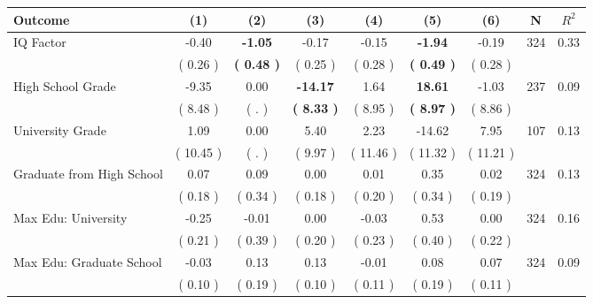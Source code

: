 \begin{tabular}{lcccccccc}
\toprule
 \textbf{Outcome} & \textbf{(1)} & \textbf{(2)} & \textbf{(3)} & \textbf{(4)} & \textbf{(5)} & \textbf{(6)} & \textbf{N} & \textbf{$ R^2$} \\
\midrule
IQ Factor &     -0.40 & \textbf{    -1.05} &     -0.17 &     -0.15 & \textbf{    -1.94} &     -0.19 & 324 &       0.33 \\ 
 & (     0.26 ) & \textbf{(     0.48 )} & (     0.25 ) & (     0.28 ) & \textbf{(     0.49 )} & (     0.28 ) & \\
High School Grade &     -9.35 &      0.00 & \textbf{   -14.17} &      1.64 & \textbf{    18.61} &     -1.03 & 237 &       0.09 \\ 
 & (     8.48 ) & (        . ) & \textbf{(     8.33 )} & (     8.95 ) & \textbf{(     8.97 )} & (     8.86 ) & \\
University Grade &      1.09 &      0.00 &      5.40 &      2.23 &    -14.62 &      7.95 & 107 &       0.13 \\ 
 & (    10.45 ) & (        . ) & (     9.97 ) & (    11.46 ) & (    11.32 ) & (    11.21 ) & \\
Graduate from High School &      0.07 &      0.09 &      0.00 &      0.01 &      0.35 &      0.02 & 324 &       0.13 \\ 
 & (     0.18 ) & (     0.34 ) & (     0.18 ) & (     0.20 ) & (     0.34 ) & (     0.19 ) & \\
Max Edu: University &     -0.25 &     -0.01 &      0.00 &     -0.03 &      0.53 &      0.00 & 324 &       0.16 \\ 
 & (     0.21 ) & (     0.39 ) & (     0.20 ) & (     0.23 ) & (     0.40 ) & (     0.22 ) & \\
Max Edu: Graduate School &     -0.03 &      0.13 &      0.13 &     -0.01 &      0.08 &      0.07 & 324 &       0.09 \\ 
 & (     0.10 ) & (     0.19 ) & (     0.10 ) & (     0.11 ) & (     0.19 ) & (     0.11 ) & \\
\bottomrule
\end{tabular}
